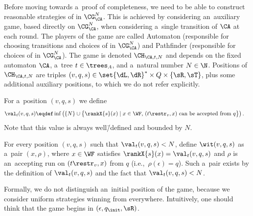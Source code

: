 \documentclass{lmcs}
\numberwithin{equation}{section}
\numberwithin{figure}{section}
\begin{document}
Before moving towards a~proof of completeness, we need to be able to construct reasonable strategies of \eve in $\CG^N_\CA$.
This is achieved by considering an~auxiliary game, based directly on $\CG^N_\CA$, when considering a~single transition of $\CA$ at each round.
The players of the game are called Automaton (responsible for choosing transitions and choices of \adam in $\CG^N_\CA$) and Pathfinder (responsible for choices of \eve in $\CG^N_\CA$).
The game is denoted $\CH_{\CA,t,N}$ and depends on the fixed automaton $\CA$, a~tree $t\in\trees_A$, and a~natural number $N\in\N$.
Positions of $\CH_{\CA,t,N}$ are triples $(v,q,s)\in\set{\dL,\dR}^\ast\times Q\times\{\sR,\sT\}$,
plus some additional auxiliary positions, to which we do not refer explicitly.

For a~position $(v,q,s)$ we define
\begin{align*}
\val_t(v,q,s)&\eqdef\inf \left(\{N\}\cup\big\{\rankX{s}(x)\mid \text{$x\in\WF$, $(t\restr_v, x)$ can be accepted from $q$}\big\}\right).
\end{align*}
Note that this value is always well\=/defined and bounded by $N$.

For every position $(v,q,s)$ such that $\val_t(v,q,s)<N$, define $\wit(v,q,s)$ as a~pair $(x,\rho)$, where $x\in \WF$ satisfies $\rankX{s}(x) = \val_t(v,q,s)$ and $\rho$ is an~accepting run on $(t\restr_v, x)$ from $q$ (i.e.,~$\rho(\epsilon)=q$).
Such a~pair exists by the definition of $\val_t(v,q,s)$ and the fact that $\val_t(v,q,s)<N$.

Formally, we do not distinguish an~initial position of the game, because we consider uniform strategies winning from everywhere.
Intuitively, one should think that the game begins in $(\epsilon, q_\init, \sR)$.
\end{document}
